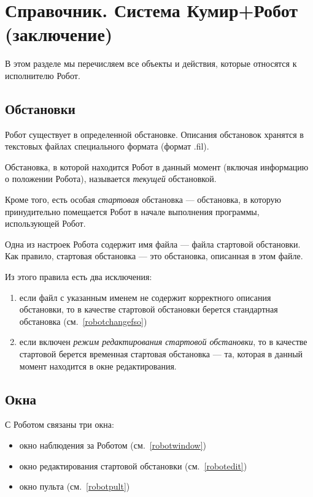 \documentclass[12pt,a4paper]{article}
\begin{document}
\section{Справочник. Система Кумир+Робот (заключение)}

В этом разделе мы перечисляем все объекты и действия, которые относятся к исполнителю Робот.

\subsection{Обстановки}

Робот существует в определенной обстановке. Описания обстановок хранятся в текстовых файлах специального формата (формат .fil).

Обстановка, в которой находится Робот в данный момент (включая информацию о положении Робота), называется \emph{текущей} обстановкой.

Кроме того, есть особая \emph{стартовая} обстановка --- обстановка, в которую принудительно помещается Робот в начале выполнения программы, использующей Робот.

Одна из настроек Робота содержит имя файла --- файла стартовой обстановки. Как правило, стартовая обстановка --- это обстановка, описанная в этом файле.

Из этого правила есть два исключения:
\begin{enumerate}
\item если файл с указанным именем не содержит корректного описания обстановки, то в качестве стартовой обстановки берется стандартная обстановка (см.~\ref{robotchangefso})
\item если включен \emph{режим редактирования стартовой обстановки}, то в качестве стартовой берется временная стартовая обстановка --- та, которая в данный момент находится в окне редактирования.
\end{enumerate}


\subsection{Окна}

С Роботом связаны три окна:
\begin{itemize}
\item окно наблюдения за Роботом (см.~\ref{robotwindow})
\item окно редактирования стартовой обстановки (см.~\ref{robotedit})
\item окно пульта (см.~\ref{robotpult})
\end{itemize}
\end{document}
